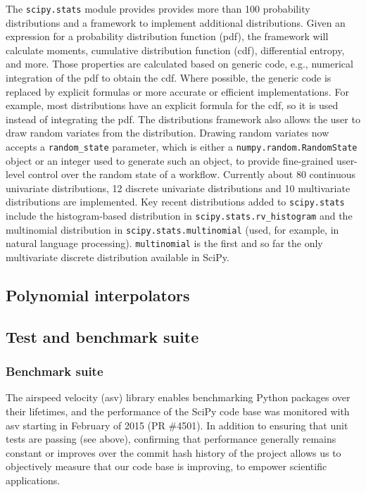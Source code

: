 \documentclass[fleqn,10pt]{wlscirep}
\begin{document}
The \texttt{scipy.stats} module provides provides more than 100 probability
distributions and a framework to implement additional distributions. Given an
expression for a probability distribution function (pdf), the framework will
calculate moments, cumulative distribution function (cdf), differential
entropy, and more. Those properties are calculated based on generic code, e.g.,
numerical integration of the pdf to obtain the cdf.  Where possible, the
generic code is replaced by explicit formulas or more accurate or efficient
implementations. For example, most distributions have an explicit formula for
the cdf, so it is used instead of integrating the pdf. The distributions
framework also allows the user to draw random variates from the distribution.
Drawing random variates now accepts a \texttt{random\_state} parameter, which
is either a \texttt{numpy.random.RandomState} object or an integer used to
generate such an object, to provide fine-grained user-level control over the
random state of a workflow.  Currently about 80 continuous univariate
distributions, 12 discrete univariate distributions and 10 multivariate
distributions are implemented.  Key recent distributions added to
\texttt{scipy.stats} include the histogram-based distribution in
\texttt{scipy.stats.rv\_histogram} and the multinomial distribution in
\texttt{scipy.stats.multinomial} (used, for example, in natural language
processing\cite{Griffiths5228}). \texttt{multinomial} is the first and so far
the only multivariate discrete distribution available in SciPy.


\subsection*{Polynomial interpolators}



\subsection*{Test and benchmark suite}

\subsubsection*{Benchmark suite}

The airspeed velocity (asv) library enables benchmarking Python packages
over their lifetimes, and the performance of the SciPy code base was monitored
with asv starting in February of 2015 (PR \#4501). In addition to ensuring that
unit tests are passing (see above), confirming that performance generally
remains constant or improves over the commit hash history of the project allows
us to objectively measure that our code base is improving, to empower
scientific applications.
\end{document}
